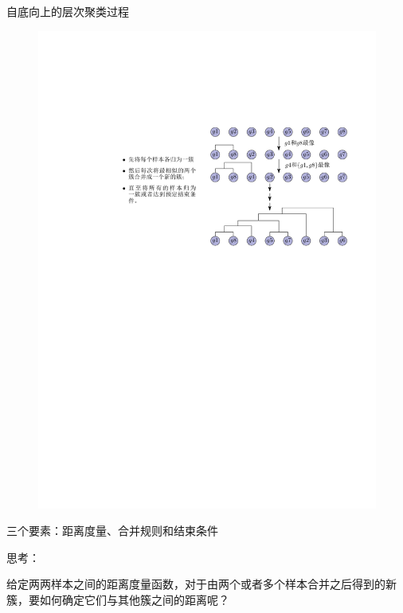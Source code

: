 \textcolor{main1}{自底向上的层次聚类过程}
\begin{figure}[htbp]
    \centering
    \includegraphics{image/自底向上.pdf}
\end{figure}
\begin{note}
    三个要素：距离度量、合并规则和结束条件
\end{note}
\begin{note}
    思考：

    给定两两样本之间的距离度量函数，对于由两个或者多个样本合并之后得到的新簇，要如何确定它们与其他簇之间的距离呢？
\end{note}
